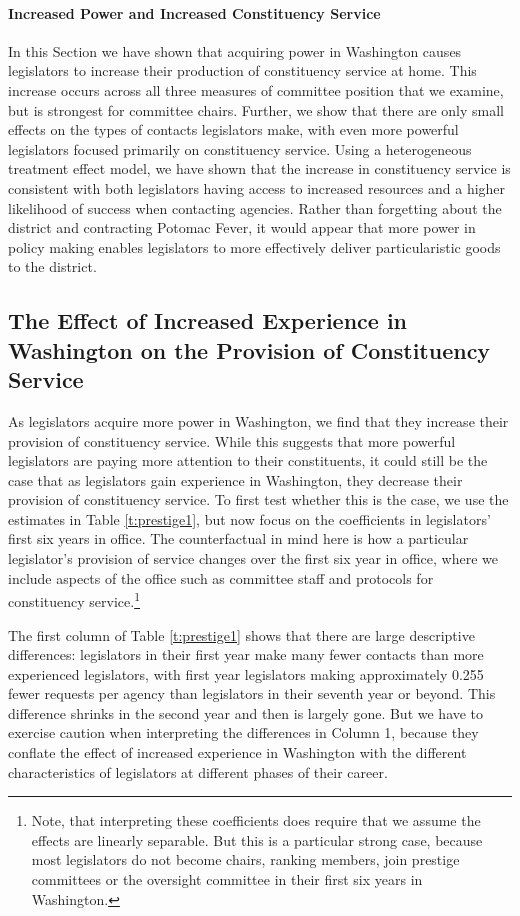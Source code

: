 \documentclass[12pt]{article}
\begin{document}
\paragraph{Increased Power and Increased Constituency Service} In this Section we have shown that acquiring power in Washington causes legislators to increase their production of constituency service at home. This increase occurs across all three measures of committee position that we examine, but is strongest for committee chairs. Further, we show that there are only small effects on the types of contacts legislators make, with even more powerful legislators focused primarily on constituency service. Using a heterogeneous treatment effect model, we have shown that the increase in constituency service is consistent with both legislators having access to increased resources and a higher likelihood of success when contacting agencies. Rather than forgetting about the district and contracting Potomac Fever, it would appear that more power in policy making enables legislators to more effectively deliver particularistic goods to the district.  

\subsection{The Effect of Increased Experience in Washington on the Provision of Constituency Service}\label{s:tenure}

As legislators acquire more power in Washington, we find that they increase their provision of constituency service. While this suggests that more powerful legislators are paying more attention to their constituents, it could still be the case that as legislators gain experience in Washington, they decrease their provision of constituency service. To first test whether this is the case, we use the estimates in Table \ref{t:prestige1}, but now focus on the coefficients in legislators' first six years in office. The counterfactual in mind here is how a particular legislator's provision of service changes over the first six year in office, where we include aspects of the office such as committee staff and protocols for constituency service.\footnote{Note, that interpreting these coefficients does require that we assume the effects are linearly separable. But this is a particular strong case, because most legislators do not become chairs, ranking members, join prestige committees or the oversight committee in their first six years in Washington. } 


The first column of Table \ref{t:prestige1} shows that there are large descriptive differences: legislators in their first year make many fewer contacts than more experienced legislators, with first year legislators making approximately 0.255 fewer requests per agency than legislators in their seventh year or beyond. This difference shrinks in the second year and then is largely gone. But we have to exercise caution when interpreting the differences in Column 1, because they conflate the effect of increased experience in Washington with the different characteristics of legislators at different phases of their career.   
\end{document}
